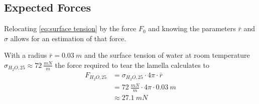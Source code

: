         \subsection{Expected Forces}\label{sec:A10 expected forces}%
        Relocating \cref{eq:surface tension} by the force \(F_0\) and knowing the parameters \(\bar{r}\) and \(\sigma\) allows
        for an estimation of that force.\par
        With a radius \(\bar{r} = \SI{0.03}{m}\) and the surface tension of water at room temperature \(\sigma_{H_2O,25} \approx \SI{72}{\frac{mN}{m}}\) \cite{surface.tension.of.pure.water.Pallas.Harrison.1990}
        the force required to tear the lamella calculates to
        \begin{align}
            F_{H_2O,25} &= \sigma_{H_2O,25} \cdot 4\pi \cdot \bar{r} \nonumber \\
                        &= \SI{72}{\frac{mN}{m}} \cdot 4\pi \cdot \SI{0.03}{m} \nonumber \\
                        &\approx \SI{27.1}{mN}
			\label{eq:calculated force}
        \end{align}

